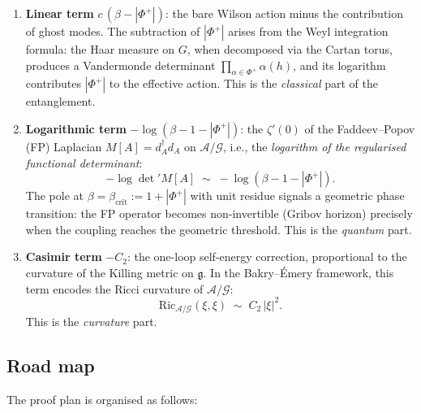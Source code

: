 \documentclass[11pt,a4paper]{amsart}
\theoremstyle{definition}
\theoremstyle{remark}
\newcommand{\calA}{\mathcal{A}}
\newcommand{\calG}{\mathcal{G}}
\newcommand{\gfrak}{\mathfrak{g}}
\newcommand{\abs}[1]{\left\lvert#1\right\rvert}
\newcommand{\Ric}{\mathrm{Ric}}
\newcommand{\PhiPlus}{\Phi^+}
\newcommand{\betacrit}{\beta_{\mathrm{crit}}}
\begin{document}
\begin{enumerate}[label=(\roman*)]
\item \textbf{Linear term} $c\,(\beta - |\PhiPlus|)$: the bare Wilson action
      minus the contribution of ghost modes. The subtraction of $|\PhiPlus|$
      arises from the Weyl integration formula: the Haar measure on $G$,
      when decomposed via the Cartan torus, produces a Vandermonde
      determinant $\prod_{\alpha \in \PhiPlus} \alpha(h)$, and its
      logarithm contributes $|\PhiPlus|$ to the effective action. This
      is the \emph{classical} part of the entanglement.

\item \textbf{Logarithmic term} $-\log(\beta - 1 - |\PhiPlus|)$: the
      $\zeta'(0)$ of the Faddeev--Popov (FP) Laplacian $M[A] = d_A^\dagger d_A$
      on $\calA/\calG$, i.e., the \emph{logarithm of the regularised
      functional determinant}:
      \[
      -\log\det' M[A] \;\sim\; -\log(\beta - 1 - |\PhiPlus|).
      \]
      The pole at $\beta = \betacrit := 1 + |\PhiPlus|$ with unit residue
      signals a geometric phase transition: the FP operator becomes
      non-invertible (Gribov horizon) precisely when the coupling reaches
      the geometric threshold. This is the \emph{quantum} part.

\item \textbf{Casimir term} $-C_2$: the one-loop self-energy correction,
      proportional to the curvature of the Killing metric on $\gfrak$.
      In the Bakry--\'Emery framework, this term encodes the Ricci curvature
      of $\calA/\calG$:
      \[
      \Ric_{\calA/\calG}(\xi, \xi) \;\sim\; C_2\,\abs{\xi}^2.
      \]
      This is the \emph{curvature} part.
\end{enumerate}

\subsection{Road map}

The proof plan is organised as follows:
\end{document}
